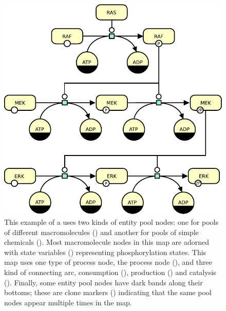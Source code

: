 \begin{figure}[h]
  \centering
  \vspace*{-0.75em}
  \includegraphics[scale=0.8]{images/MAPK-only}
  \caption{This example of a \PD uses two kinds of entity pool nodes: one for pools of different macromolecules () and another for pools of simple chemicals (). Most macromolecule nodes in this map are adorned with state variables () representing phosphorylation states. This map uses one type of process node, the process node (), and three kind of connecting arc, consumption (), production () and catalysis ().  Finally, some entity pool nodes have dark bands along their bottoms; these are clone markers () indicating that the same pool nodes appear multiple times in the map.}
  \label{fig:eg1}
\end{figure}

